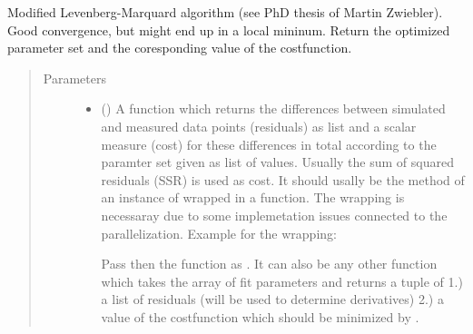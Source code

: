 \documentclass[letterpaper,10pt,english]{sphinxmanual}
\begin{document}
\begin{fulllineitems}
\label{\detokenize{modules-api/fitters:Fitters.Levenberg_Marquardt_Fitter}}
Modified Levenberg-Marquard algorithm (see PhD thesis of Martin Zwiebler). Good convergence, but might end up in a local mininum.
Return the optimized parameter set and the coresponding value of the costfunction.
\begin{quote}\begin{description}
\item[{Parameters}] \leavevmode\begin{itemize}
\item {} 
 () \textendash{} 
A function which returns the differences between simulated and measured data points (residuals) as list and a scalar measure (cost) for these differences in total according to the paramter set given as list of values. Usually the sum of squared residuals (SSR) is used as cost. It should usally be the method  of an instance of  wrapped in a function. The wrapping is necessaray due to some implemetation issues connected to the parallelization.
Example for the wrapping:

%
\begin{sphinxVerbatim}[commandchars=\\\{\}]
  
 
     
\end{sphinxVerbatim}

Pass then the function  as . It can also be any other function which takes the array of fit parameters and returns a tuple of
1.) a list of residuals (will be used to determine derivatives) 2.) a value of the costfunction which should be minimized by .



\end{itemize}
\end{description}
\end{quote}
\end{fulllineitems}
\end{document}
